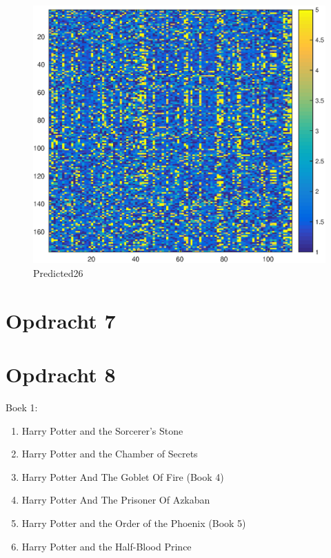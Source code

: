 \documentclass[11pt,a4paper]{article}
\begin{document}
\begin{figure}[H]
\centering
\includegraphics[scale=0.55]{opdracht6}
\caption{Predicted26}
\end{figure}



\section*{Opdracht 7}



\section*{Opdracht 8}

Boek 1:
\begin{enumerate}
\item Harry Potter and the Sorcerer's Stone
\item Harry Potter and the Chamber of Secrets
\item Harry Potter And The Goblet Of Fire (Book 4)
\item Harry Potter And The Prisoner Of Azkaban
\item Harry Potter and the Order of the Phoenix (Book 5)
\item Harry Potter and the Half-Blood Prince
\end{enumerate}
\end{document}
